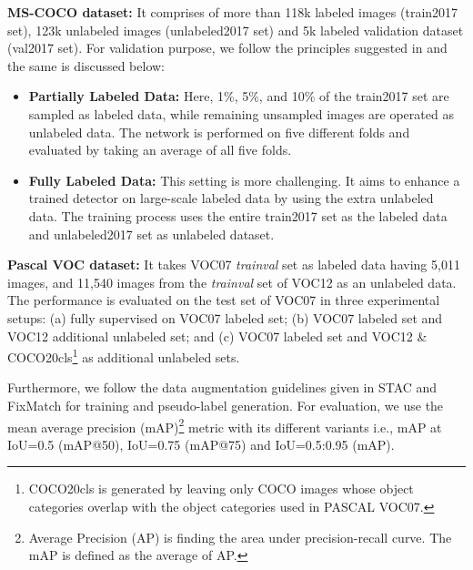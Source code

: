 \documentclass[10pt,twocolumn,letterpaper]{article}
\begin{document}
\noindent \textbf{MS-COCO dataset:} It comprises of more than 118k labeled images (train2017 set), 123k unlabeled images (unlabeled2017 set) and 5k labeled validation dataset (val2017 set). For validation purpose, we follow the principles suggested in \cite{sohn2020simple,tang2021proposal,jeong2019consistency} and the same is discussed below:\vspace{-0.5em}
\begin{itemize}
    \item \textbf{Partially Labeled Data:} Here, 1\%, 5\%, and 10\% of the train2017 set are sampled as labeled data, while remaining unsampled images are operated as unlabeled data. The network is performed on five different folds and evaluated by taking an average of all five folds.\vspace{-0.7em}
    \item \textbf{Fully Labeled Data:} This setting is more challenging. It aims to enhance a trained detector on large-scale labeled data by using the extra unlabeled data. The training process uses the entire train2017 set as the labeled data and unlabeled2017 set as unlabeled dataset.\vspace{-0.5em}
\end{itemize}




\noindent \textbf{Pascal VOC dataset:} 
It takes VOC07 \textit{trainval} set as labeled data having 5,011 images, and 11,540 images from the \textit{trainval} set of VOC12 as an unlabeled data. The performance is evaluated on the test set of VOC07 in three experimental setups: (a) fully supervised on VOC07 labeled set; (b) VOC07 labeled set and VOC12 additional unlabeled set; and (c) VOC07 labeled set and VOC12 \& COCO20cls\footnote{COCO20cls is generated by leaving only COCO images whose object categories overlap with the object categories used in PASCAL VOC07.} as additional unlabeled sets.





Furthermore, we follow the data augmentation guidelines given in STAC \cite{sohn2020simple} and FixMatch \cite{sohn2020fixmatch} for training and pseudo-label generation. 
For evaluation, we use the mean average precision (mAP)\footnote{Average Precision (AP) is finding the area under precision-recall curve. 
The mAP is defined as the average of AP.} metric with its different variants i.e., mAP at IoU=0.5 (mAP@50), IoU=0.75 (mAP@75) and IoU=0.5:0.95 (mAP). 
\vspace{-0.5em}
\end{document}
